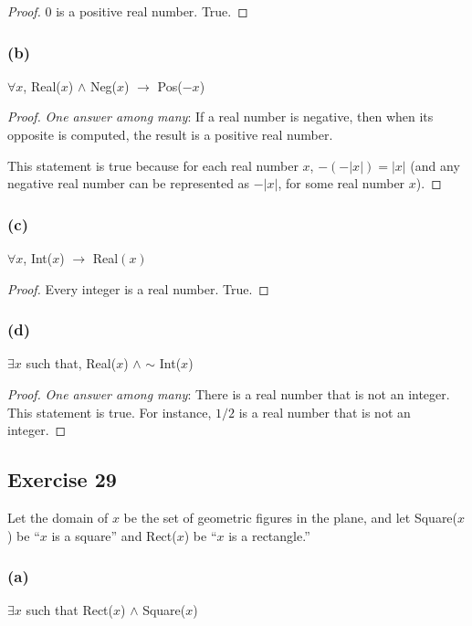 \documentclass[14pt]{extarticle}
\newcommand{\fa}{\forall}
\newcommand{\te}{\exists}
\begin{document}
\begin{proof}
0 is a positive real number. True.
\end{proof}

\subsubsection{(b)}
$\fa x$, Real($x$) $\wedge$ Neg($x$) $\to$ Pos($-x$)

\begin{proof}
{\it One answer among many}: If a real number is negative, then when its opposite is computed, the result is a positive real number.

This statement is true because for each real number $x$, $-(-|x|) = |x|$ (and any negative real number can be represented as $-|x|$, for some real number $x$).
\end{proof}

\subsubsection{(c)}
$\fa x$, Int($x$) $\to$ Real$(x)$

\begin{proof}
Every integer is a real number. True.
\end{proof}

\subsubsection{(d)}
$\te x$ such that, Real($x$) $\wedge$ $\sim$ Int($x$) 

\begin{proof}
{\it One answer among many}: There is a real number that is not an integer. This statement is true. For instance, $1/2$ is a real number that is not an integer.
\end{proof}

\subsection{Exercise 29}
Let the domain of $x$ be the set of geometric figures in the plane, and let Square($x$) be “$x$ is a square” and Rect($x$) be “$x$ is a rectangle.”

\subsubsection{(a)}
$\te x$ such that Rect($x$) $\wedge$ Square($x$)
\end{document}
